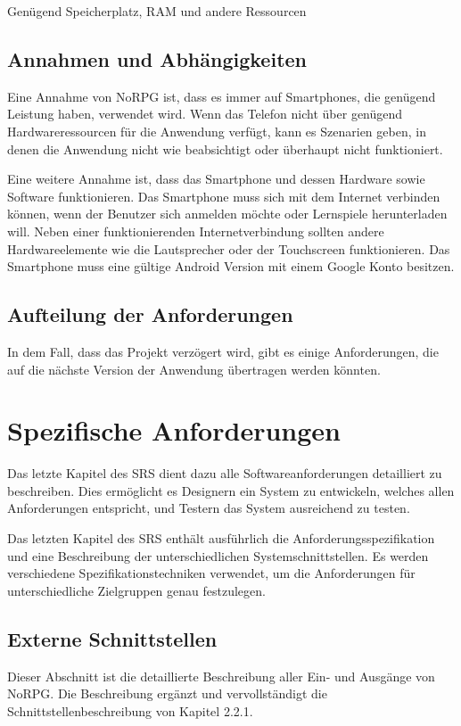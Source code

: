 		Genügend Speicherplatz, RAM und andere Ressourcen
				
	\subsection{Annahmen und Abhängigkeiten}
		Eine Annahme von NoRPG ist, dass es immer auf Smartphones, die genügend Leistung haben, verwendet wird. Wenn das Telefon nicht über genügend Hardwareressourcen für die Anwendung verfügt, kann es Szenarien geben, in denen die Anwendung nicht wie beabsichtigt oder überhaupt nicht funktioniert.
		
		Eine weitere Annahme ist, dass das Smartphone und dessen Hardware sowie Software funktionieren. Das Smartphone muss sich mit dem Internet verbinden können, wenn der Benutzer sich anmelden möchte oder Lernspiele herunterladen will. Neben einer funktionierenden Internetverbindung sollten andere Hardwareelemente wie die Lautsprecher oder der Touchscreen funktionieren. Das Smartphone muss eine gültige Android Version mit einem Google Konto besitzen.
		
	\subsection{Aufteilung der Anforderungen}
		In dem Fall, dass das Projekt verzögert wird, gibt es einige Anforderungen, die auf die nächste Version der Anwendung übertragen werden könnten.

\section{Spezifische Anforderungen}
	Das letzte Kapitel des SRS dient dazu alle Softwareanforderungen detailliert zu beschreiben. Dies ermöglicht es Designern ein System zu entwickeln, welches allen Anforderungen entspricht, und Testern das System ausreichend zu testen.
	
	Das letzten Kapitel des SRS enthält ausführlich die Anforderungsspezifikation und eine Beschreibung der unterschiedlichen Systemschnittstellen. Es werden verschiedene Spezifikationstechniken verwendet, um die Anforderungen für unterschiedliche Zielgruppen genau festzulegen.
	
	\subsection{Externe Schnittstellen}
		Dieser Abschnitt ist die detaillierte Beschreibung aller Ein- und Ausgänge von NoRPG. Die Beschreibung ergänzt und vervollständigt die Schnittstellenbeschreibung von Kapitel 2.2.1. 
	
